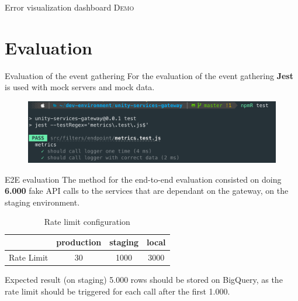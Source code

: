 \documentclass[10pt]{beamer}
\begin{document}
\begin{frame}{Error visualization dashboard}
    \centering
    \huge \textsc{Demo}
\end{frame}

\section{Evaluation}


\begin{frame}{Evaluation of the event gathering}
    For the evaluation of the event gathering \textbf{Jest} is used with mock servers and mock data.
    
    \begin{figure}
        \centering
        \includegraphics[scale=0.4]{src/presentation/img/jest.png}
    \end{figure}
\end{frame}


\begin{frame}{E2E evaluation}
    The method for the end-to-end evaluation consisted on doing \textbf{6.000} fake API calls to the services that are dependant on the gateway, on the staging environment.
    \vspace{0.5cm}
\begin{table}[]
    \centering
    \begin{tabular}{cccc}
    \toprule
         &  production & staging & local \\
    \midrule
    Rate Limit & 30 & 1000 & 3000 \\
    \bottomrule
    \end{tabular}
    \caption{Rate limit configuration}
    \label{tab:my_label}
\end{table}

    \begin{block}{Expected result (on staging)}
        5.000 rows should be stored on BigQuery, as the rate limit should be triggered for each call after the first 1.000.
    \end{block}
\end{frame}
\end{document}
